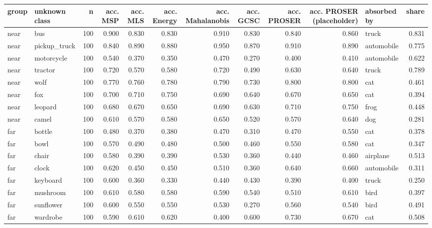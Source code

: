 \begin{tabular}{llrrrrrrrrlr}
\toprule
group & unknown class & n & acc. MSP & acc. MLS & acc. Energy & acc. Mahalanobis & acc. GCSC & acc. PROSER & acc. PROSER (placeholder) & absorbed by & share \\
\midrule
near & bus & 100 & 0.900 & 0.830 & 0.830 & 0.910 & 0.830 & 0.840 & 0.860 & truck & 0.831 \\
near & pickup\_truck & 100 & 0.840 & 0.890 & 0.880 & 0.950 & 0.870 & 0.910 & 0.890 & automobile & 0.775 \\
near & motorcycle & 100 & 0.540 & 0.370 & 0.350 & 0.470 & 0.270 & 0.400 & 0.410 & automobile & 0.622 \\
near & tractor & 100 & 0.720 & 0.570 & 0.580 & 0.720 & 0.490 & 0.630 & 0.640 & truck & 0.789 \\
near & wolf & 100 & 0.770 & 0.760 & 0.780 & 0.790 & 0.730 & 0.800 & 0.800 & cat & 0.461 \\
near & fox & 100 & 0.700 & 0.710 & 0.750 & 0.690 & 0.640 & 0.670 & 0.650 & cat & 0.394 \\
near & leopard & 100 & 0.680 & 0.670 & 0.650 & 0.690 & 0.630 & 0.710 & 0.750 & frog & 0.448 \\
near & camel & 100 & 0.610 & 0.570 & 0.580 & 0.650 & 0.520 & 0.570 & 0.640 & dog & 0.281 \\
far & bottle & 100 & 0.480 & 0.370 & 0.380 & 0.470 & 0.310 & 0.470 & 0.550 & cat & 0.378 \\
far & bowl & 100 & 0.570 & 0.490 & 0.480 & 0.500 & 0.460 & 0.550 & 0.580 & cat & 0.347 \\
far & chair & 100 & 0.580 & 0.390 & 0.390 & 0.530 & 0.360 & 0.440 & 0.460 & airplane & 0.513 \\
far & clock & 100 & 0.620 & 0.450 & 0.450 & 0.510 & 0.360 & 0.640 & 0.660 & automobile & 0.311 \\
far & keyboard & 100 & 0.600 & 0.360 & 0.330 & 0.440 & 0.430 & 0.390 & 0.400 & truck & 0.250 \\
far & mushroom & 100 & 0.610 & 0.580 & 0.580 & 0.590 & 0.540 & 0.510 & 0.610 & bird & 0.397 \\
far & sunflower & 100 & 0.600 & 0.550 & 0.550 & 0.530 & 0.270 & 0.560 & 0.540 & bird & 0.491 \\
far & wardrobe & 100 & 0.590 & 0.610 & 0.620 & 0.400 & 0.600 & 0.730 & 0.670 & cat & 0.508 \\
\bottomrule
\end{tabular}
